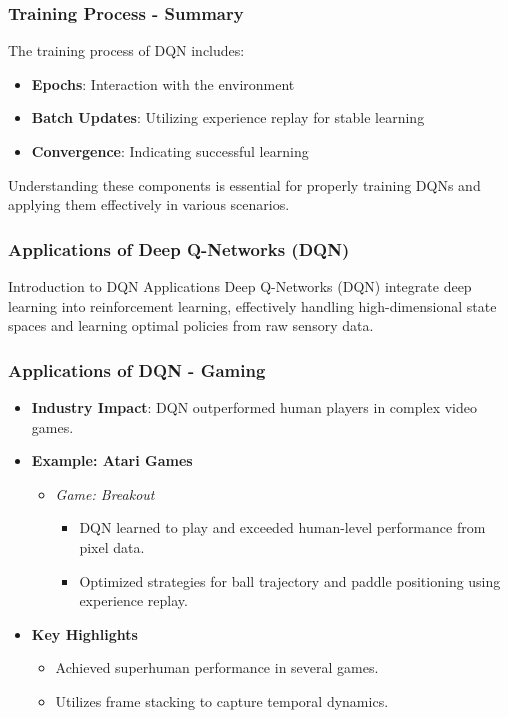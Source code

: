 \documentclass{beamer}
\begin{document}
\begin{frame}[fragile]
    \frametitle{Training Process - Summary}
    The training process of DQN includes:
    \begin{itemize}
        \item \textbf{Epochs}: Interaction with the environment
        \item \textbf{Batch Updates}: Utilizing experience replay for stable learning
        \item \textbf{Convergence}: Indicating successful learning
    \end{itemize}
    Understanding these components is essential for properly training DQNs and applying them effectively in various scenarios.
\end{frame}

\begin{frame}[fragile]
    \frametitle{Applications of Deep Q-Networks (DQN)}
    \begin{block}{Introduction to DQN Applications}
        Deep Q-Networks (DQN) integrate deep learning into reinforcement learning, effectively handling high-dimensional state spaces and learning optimal policies from raw sensory data.
    \end{block}
\end{frame}

\begin{frame}[fragile]
    \frametitle{Applications of DQN - Gaming}
    \begin{itemize}
        \item \textbf{Industry Impact}: DQN outperformed human players in complex video games.
        \item \textbf{Example: Atari Games}
        \begin{itemize}
            \item \textit{Game: Breakout}
                \begin{itemize}
                    \item DQN learned to play and exceeded human-level performance from pixel data.
                    \item Optimized strategies for ball trajectory and paddle positioning using experience replay.
                \end{itemize}
        \end{itemize}
        \item \textbf{Key Highlights}
        \begin{itemize}
            \item Achieved superhuman performance in several games.
            \item Utilizes frame stacking to capture temporal dynamics.
        \end{itemize}
    \end{itemize}
\end{frame}
\end{document}
